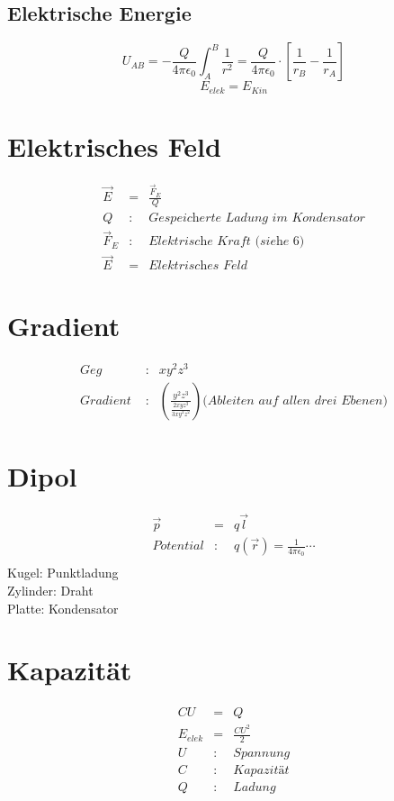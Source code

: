 \documentclass[11pt]{article}
\begin{document}
\subsection{Elektrische Energie}
$$U_{AB}=-\frac{Q}{4\pi \epsilon_0} \int_A^B \frac{1}{r^2} = \frac{Q}{4\pi \epsilon_0}\cdot [\frac{1}{r_B}-\frac{1}{r_A}]$$
$$E_{elek} = E_{Kin}$$

\section{Elektrisches Feld}
\begin{eqnarray*}
\overrightarrow{E}&=&\frac{\overrightarrow{F}_E}{Q}\\
Q &:& \textit{Gespeicherte Ladung im Kondensator}\\
\overrightarrow{F}_E &:& \textit{Elektrische Kraft (siehe 6)}\\
\overrightarrow{E} &=& \textit{Elektrisches Feld}
\end{eqnarray*}

\section{Gradient}
\begin{eqnarray*}
\textit{Geg }&:&xy^2z^3\\
\textit{Gradient }&:& (\frac{y^2z^3}{\frac{2xyz^3}{3xy^2z^2}})\textit{(Ableiten auf allen drei Ebenen)}
\end{eqnarray*}

\section{Dipol}
\begin{eqnarray*}
\overrightarrow{p} &=& q\overrightarrow{l}\\
\textit{Potential} &:& q(\overrightarrow{r}) = \frac{1}{4\pi \epsilon_0}\cdots\\
\end{eqnarray*}
Kugel: Punktladung\\
Zylinder: Draht\\
Platte: Kondensator



\section{Kapazität}
\begin{eqnarray*}
CU &=& Q\\
E_{elek} &=& \frac{CU^2}{2}\\
U &:& \textit{Spannung}\\
C &:& \textit{Kapazität}\\
Q &:& \textit{Ladung}
\end{eqnarray*}
\end{document}

